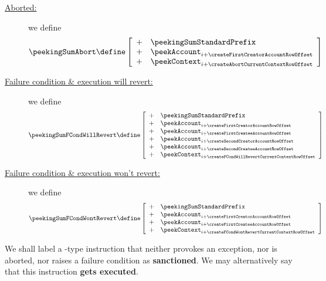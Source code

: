 \begin{description}
\[		\]
	\item[\underline{Aborted:}]
		we define
		\[
			\peekingSumAbort
			\define
			\left[ \begin{array}{ll}
				+ & \peekingSumStandardPrefix  \\
				+ & \peekAccount      _{i + \createFirstCreatorAccountRowOffset} \\
				+ & \peekContext      _{i + \createAbortCurrentContextRowOffset} \\
			\end{array} \right]
		\]
	\item[\underline{Failure condition \& execution will  revert:}]
		we define
		\[
			\peekingSumFCondWillRevert
			\define
			\left[ \begin{array}{ll}
				+ & \peekingSumStandardPrefix  \\
				+ & \peekAccount      _{i + \createFirstCreatorAccountRowOffset} \\
				+ & \peekAccount      _{i + \createFirstCreateeAccountRowOffset} \\
				+ & \peekAccount      _{i + \createSecondCreatorAccountRowOffset} \\
				+ & \peekAccount      _{i + \createSecondCreateeAccountRowOffset} \\
				+ & \peekContext      _{i + \createFCondWillRevertCurrentContextRowOffset} \\
			\end{array} \right]
		\]
	\item[\underline{Failure condition \& execution won't revert:}]
		we define
		\[
			\peekingSumFCondWontRevert
			\define
			\left[ \begin{array}{ll}
				+ & \peekingSumStandardPrefix  \\
				+ & \peekAccount      _{i + \createFirstCreatorAccountRowOffset} \\
				+ & \peekAccount      _{i + \createFirstCreateeAccountRowOffset} \\
				+ & \peekContext      _{i + \createFCondWontRevertCurrentContextRowOffset} \\
			\end{array} \right]
		\]
\end{description}
We shall label a -type instruction that neither provokes an exception, nor is aborted, nor raises a failure condition as \textbf{sanctioned}. We may alternatively say that this instruction \textbf{gets executed}.
